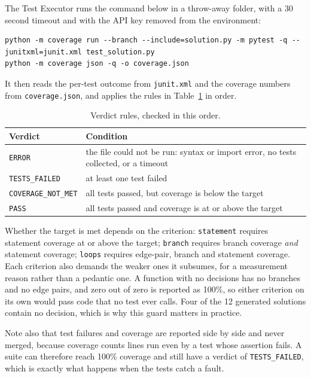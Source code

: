 \documentclass[11pt,a4paper]{article}
\begin{document}
The Test Executor runs the command below in a throw-away folder, with a 30 second timeout and with the API key
removed from the environment:

\begin{lstlisting}[style=plain]
python -m coverage run --branch --include=solution.py -m pytest -q --junitxml=junit.xml test_solution.py
python -m coverage json -q -o coverage.json
\end{lstlisting}

It then reads the per-test outcome from \texttt{junit.xml} and the coverage numbers from
\texttt{coverage.json}, and applies the rules in Table~\ref{tab:verdicts} in order.

\begin{table}[htbp]
\centering
\small
\caption{Verdict rules, checked in this order.}
\label{tab:verdicts}
\begin{tabular}{@{}ll@{}}
\toprule
\textbf{Verdict} & \textbf{Condition} \\
\midrule
\texttt{ERROR} & the file could not be run: syntax or import error, no tests collected, or a timeout \\
\texttt{TESTS\_FAILED} & at least one test failed \\
\texttt{COVERAGE\_NOT\_MET} & all tests passed, but coverage is below the target \\
\texttt{PASS} & all tests passed and coverage is at or above the target \\
\bottomrule
\end{tabular}
\end{table}

Whether the target is met depends on the criterion: \texttt{statement} requires statement coverage at or above
the target; \texttt{branch} requires branch coverage \emph{and} statement coverage; \texttt{loops} requires
edge-pair, branch and statement coverage. Each criterion also demands the weaker ones it subsumes, for a
measurement reason rather than a pedantic one. A function with no decisions has no branches and no edge pairs,
and zero out of zero is reported as 100\%, so either criterion on its own would pass code that no test ever
calls. Four of the 12 generated solutions contain no decision, which is why this guard matters in practice.

Note also that test failures and coverage are reported side by side and never merged, because coverage counts
lines run even by a test whose assertion fails. A suite can therefore reach 100\% coverage and still have a
verdict of \texttt{TESTS\_FAILED}, which is exactly what happens when the tests catch a fault.
\end{document}
